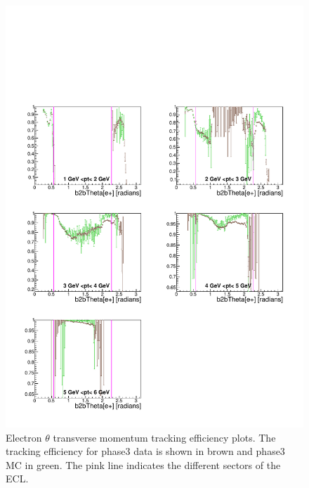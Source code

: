 \documentclass[a4paper,11pt,twosided,final,german,openbib,pdftex,listof=totoc,bibliography=totoc]{scrbook}
\begin{document}
\begin{figure}[!htbp]
	\centering
	\includegraphics[width=\textwidth]{Plots/master3/xPtMThetaemP3}
	\caption[Transverse Momentum $\theta$ Electron Efficiency Phase3]{Electron $\theta$ transverse momentum tracking efficiency plots. The tracking efficiency for phase3 data is shown in brown and phase3 MC in green. The pink line indicates the different sectors of the ECL.}
	
	\label{plt:xPtMThetaem3}
\end{figure}
\end{document}
